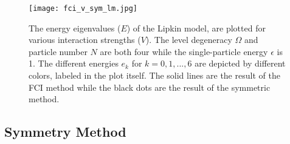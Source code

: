 \documentclass[Dual]{msu-thesis}
\begin{document}
\begin{figure}[h]
    \centering
    \texttt{[image: fci\_v\_sym\_lm.jpg]}
    \caption{The energy eigenvalues ($E$) of the Lipkin model, are plotted for various interaction strengths ($V$). The level degeneracy $\Omega$ and particle number $N$ are both four while the single-particle energy $\epsilon$ is 1. The different energies $e_k$ for $k=0,1,...,6$ are depicted by different colors, labeled in the plot itself. The solid lines are the result of the FCI method while the black dots are the result of the symmetric method.}
    \label{fig:fci_plot}
\end{figure}

\subsection{Symmetry Method}
\label{subsection:symmetry_method}
\end{document}

